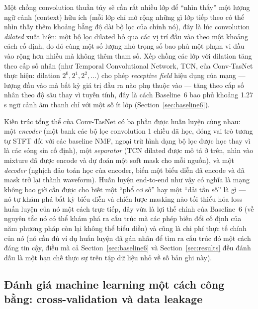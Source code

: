 \documentclass[11pt]{article}
\begin{document}
Một chồng convolution thuần túy sẽ cần rất nhiều lớp để ``nhìn thấy'' một
lượng ngữ cảnh (context) hữu ích (mỗi lớp chỉ mở rộng những gì lớp tiếp
theo có thể nhìn thấy thêm khoảng bằng độ dài bộ lọc của chính nó), đây là
lúc convolution \emph{dilated} xuất hiện: một bộ lọc dilated bỏ qua các vị
trí đầu vào theo một khoảng cách cố định, do đó cùng một số lượng nhỏ
trọng số bao phủ một phạm vi đầu vào rộng hơn nhiều mà không thêm tham số.
Xếp chồng các lớp với dilation tăng theo cấp số nhân (như Temporal
Convolutional Network, TCN, của Conv-TasNet thực hiện: dilation
$2^0, 2^1, 2^2,\dots$) cho phép \emph{receptive field} hiệu dụng của mạng
--- lượng đầu vào mà bất kỳ giá trị đầu ra nào phụ thuộc vào --- tăng theo
cấp số nhân theo độ sâu thay vì tuyến tính, đây là cách Baseline~6 bao phủ
khoảng 1.27\,s ngữ cảnh âm thanh chỉ với một số ít lớp
(Section~\ref{sec:baseline6}).

Kiến trúc tổng thể của Conv-TasNet có ba phần được huấn luyện cùng nhau:
một \emph{encoder} (một bank các bộ lọc convolution 1 chiều đã học, đóng
vai trò tương tự STFT đối với các baseline NMF, ngoại trừ hình dạng bộ lọc
được học thay vì là các sóng sin cố định), một \emph{separator} (TCN
dilated được mô tả ở trên, nhìn vào mixture đã được encode và dự đoán một
soft mask cho mỗi nguồn), và một \emph{decoder} (nghịch đảo toán học của
encoder, biến một biểu diễn đã encode và đã mask trở lại thành waveform).
Huấn luyện end-to-end như vậy có nghĩa là mạng không bao giờ cần được cho
biết một ``phổ cơ sở'' hay một ``dải tần số'' là gì --- nó tự khám phá bất
kỳ biểu diễn và chiến lược masking nào tối thiểu hóa loss huấn luyện của
nó một cách trực tiếp, đây vừa là lợi thế chính của Baseline~6 (về nguyên
tắc nó có thể khám phá ra cấu trúc mà các phép biến đổi cố định của năm
phương pháp còn lại không thể biểu diễn) và cũng là chi phí thực tế chính
của nó (nó cần đủ ví dụ huấn luyện đã gán nhãn để tìm ra cấu trúc đó một
cách đáng tin cậy, điều mà cả Section~\ref{sec:baseline6} và
Section~\ref{sec:results} đều đánh dấu là một hạn chế thực sự trên tập dữ
liệu nhỏ về số bản ghi này).

\subsection{Đánh giá machine learning một cách công bằng: cross-validation và data leakage}
\label{sec:bg-cv}
\end{document}
